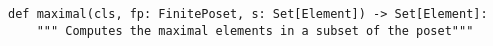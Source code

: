 \begin{verbatim}
def maximal(cls, fp: FinitePoset, s: Set[Element]) -> Set[Element]:
    """ Computes the maximal elements in a subset of the poset"""
\end{verbatim}